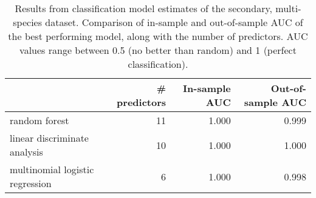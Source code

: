 \begin{table}[ht]
  \centering
  \begin{tabular}{ l r r r }
    \hline
    & \# predictors & In-sample AUC & Out-of-sample AUC \\ 
    \hline
    random forest &   11 & 1.000 & 0.999 \\ 
    linear discriminate analysis &   10 & 1.000 & 1.000 \\ 
    multinomial logistic regression &    6 & 1.000 & 0.998 \\ 
    \hline
  \end{tabular}
  \caption{Results from classification model estimates of the secondary, multi-species dataset. Comparison of in-sample and out-of-sample AUC of the best performing model, along with the number of predictors. AUC values range between 0.5 (no better than random) and 1 (perfect classification).}
  \label{tab:second_res}
\end{table}
